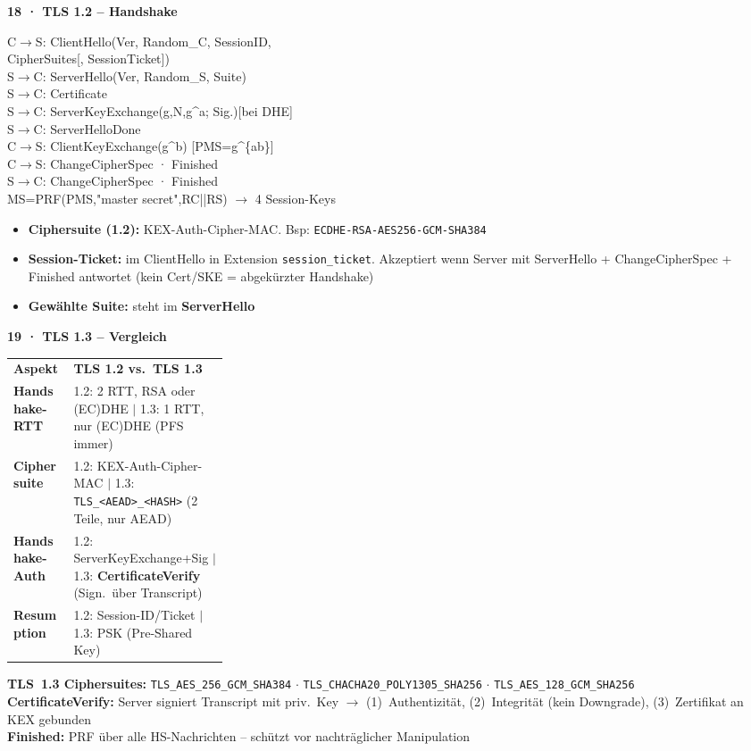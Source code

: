 \documentclass[11pt,a4paper]{article}
\newcommand{\tabstart}{%
  \rowcolors{2}{rowgray}{white}%
}
\newcommand{\tabend}{\rowcolors{1}{}{}}
\newcommand{\h}[1]{%
  \vspace{3pt}%
  \noindent\colorbox{hdr2}{%
    \parbox{\dimexpr\linewidth-2\fboxsep}{\color{white}\bfseries #1}}%
  \par\vspace{1pt}%
}
\newenvironment{ibox}{\begin{mdframed}[style=infoS]}{\end{mdframed}}
\newenvironment{tbox}{\begin{mdframed}[style=treeS]\ttfamily\small}{\end{mdframed}}
\newcommand{\THH}[1]{\cellcolor{hdrtbl}\color{white}\textbf{#1}}
\begin{document}
\begin{multicols}{2}
\h{18 · TLS 1.2 -- Handshake}
\begin{tbox}
C$\to$S: ClientHello(Ver, Random\_C, SessionID,\\
\hspace*{7mm} CipherSuites[, SessionTicket])\\
S$\to$C: ServerHello(Ver, Random\_S, Suite)\\
S$\to$C: Certificate\\
S$\to$C: ServerKeyExchange(g,N,g\^{}a; Sig.)[bei DHE]\\
S$\to$C: ServerHelloDone\\
C$\to$S: ClientKeyExchange(g\^{}b) [PMS=g\^{}\{ab\}]\\
C$\to$S: ChangeCipherSpec · Finished\\
S$\to$C: ChangeCipherSpec · Finished\\
MS=PRF(PMS,"master secret",RC||RS) $\to$ 4 Session-Keys
\end{tbox}
\begin{itemize}
\item \textbf{Ciphersuite (1.2):} KEX-Auth-Cipher-MAC.
  Bsp: \texttt{ECDHE-RSA-AES256-GCM-SHA384}
\item \textbf{Session-Ticket:} im ClientHello in Extension
  \texttt{session\_ticket}. Akzeptiert wenn Server mit
  ServerHello + ChangeCipherSpec + Finished antwortet
  (kein Cert/SKE = abgekürzter Handshake)
\item \textbf{Gewählte Suite:} steht im \textbf{ServerHello}
\end{itemize}

\h{19 · TLS 1.3 -- Vergleich}

\tabstart
\begin{tabularx}{\linewidth}{K{0.28\linewidth}L}
\THH{Aspekt} & \THH{TLS 1.2 vs.\ TLS 1.3}\\
\textbf{Handshake-RTT}  & 1.2: 2 RTT, RSA oder (EC)DHE $|$
  1.3: 1 RTT, nur (EC)DHE (PFS immer)\\
\textbf{Ciphersuite}    & 1.2: KEX-Auth-Cipher-MAC $|$
  1.3: \texttt{TLS\_<AEAD>\_<HASH>} (2 Teile, nur AEAD)\\
\textbf{Handshake-Auth} & 1.2: ServerKeyExchange+Sig $|$
  1.3: \textbf{CertificateVerify} (Sign.\ über Transcript)\\
\textbf{Resumption}     & 1.2: Session-ID/Ticket $|$
  1.3: PSK (Pre-Shared Key)\\
\end{tabularx}
\tabend

\begin{ibox}
\textbf{TLS~1.3 Ciphersuites:} \texttt{TLS\_AES\_256\_GCM\_SHA384}
$\cdot$ \texttt{TLS\_CHACHA20\_POLY1305\_SHA256}
$\cdot$ \texttt{TLS\_AES\_128\_GCM\_SHA256}\\
\textbf{CertificateVerify:} Server signiert Transcript mit priv.\ Key
$\to$ (1)~Authentizität, (2)~Integrität (kein Downgrade),
(3)~Zertifikat an KEX gebunden\\
\textbf{Finished:} PRF über alle HS-Nachrichten -- schützt vor
nachträglicher Manipulation
\end{ibox}


\end{multicols}
\end{document}
